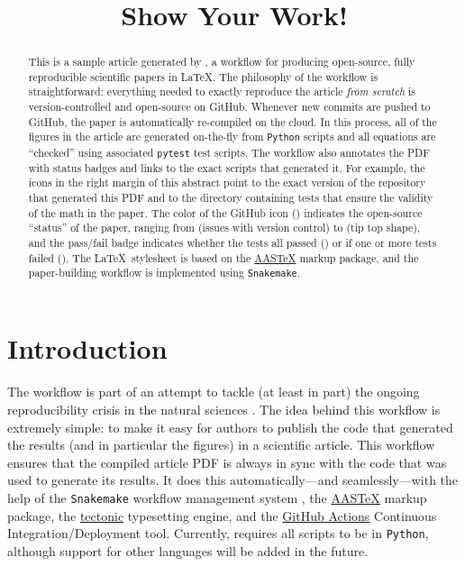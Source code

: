 \documentclass[modern]{aastex62}
\begin{document}
\title{Show Your Work!}

\author[\myORCID]{\myName}
\email{\myEmail}
\affil{\myAffil}

\begin{abstract}
    This is a sample article generated by \showyourwork, a workflow for producing open-source, fully reproducible scientific papers in \LaTeX.
    The philosophy of the workflow is straightforward: everything needed to exactly reproduce the article \emph{from scratch} is version-controlled and open-source on GitHub.
    Whenever new commits are pushed to GitHub, the paper is automatically re-compiled on the cloud.
    In this process, all of the figures in the article are generated on-the-fly from \texttt{Python} scripts and all equations are ``checked'' using associated \texttt{pytest} test scripts.
    The \showyourwork workflow also annotates the PDF with status badges and links to the exact scripts that generated it.
    For example, the icons in the right margin of this abstract point to the exact version of the repository that generated this PDF and to the directory containing tests that ensure the validity of the math in the paper.
    The color of the GitHub icon (\GitHubIcon) indicates the open-source ``status'' of the paper, ranging from \GitHubIconRed (issues with version control) to \GitHubIconBlue (tip top shape), and the pass/fail badge indicates whether the tests all passed (\TestPassIcon) or if one or more tests failed (\TestFailIcon).
    The \LaTeX\, stylesheet is based on the \href{https://journals.aas.org/aastex-package-for-manuscript-preparation/}{AASTeX} markup package, and the paper-building workflow is implemented using \texttt{Snakemake}.
\end{abstract}

\section{Introduction}

The \showyourwork workflow is part of an attempt to tackle (at least in part) the ongoing reproducibility crisis in the natural sciences \citep[see, e.g.,][]{Baker2016}.
The idea behind this workflow is extremely simple: to make it easy for authors to publish the code that generated the results (and in particular the figures) in a scientific article.
This workflow ensures that the compiled article PDF is always in sync with the code that was used to generate its results.
It does this automatically---and seamlessly---with the help of the \texttt{Snakemake} workflow management system \citep{Molder2021}, the \href{https://journals.aas.org/aastex-package-for-manuscript-preparation/}{AASTeX} markup package, the \href{https://github.com/tectonic-typesetting/tectonic}{tectonic} typesetting engine, and the \href{https://github.com/features/actions}{GitHub Actions} Continuous Integration/Deployment tool. Currently, \showyourwork requires all scripts to be in \texttt{Python}, although support for other languages will be added in the future.
\end{document}
